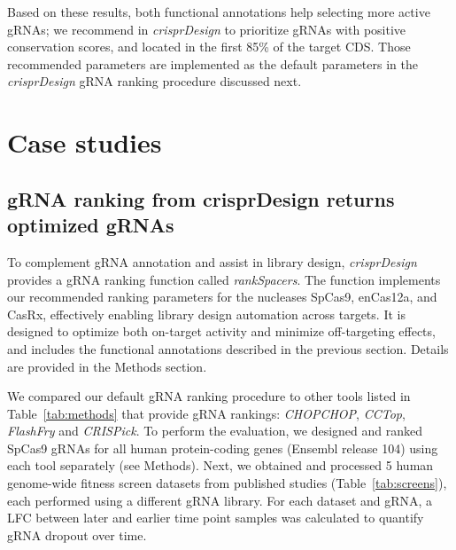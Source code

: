 \documentclass[pdftex,english,10pt]{article}
\begin{document}
Based on these results, both functional annotations help selecting more active gRNAs; we recommend in \textit{crisprDesign} to prioritize gRNAs with positive conservation scores, and located in the first 85\% of the target CDS. Those recommended parameters are implemented as the default parameters in the \textit{crisprDesign} gRNA ranking procedure discussed next. 






\section{Case studies}





\subsection{gRNA ranking from crisprDesign returns optimized gRNAs}

To complement gRNA annotation and assist in library design, \textit{crisprDesign} provides a gRNA ranking function called \textit{rankSpacers}. 
The function implements our recommended ranking parameters for the nucleases SpCas9, enCas12a, and CasRx, effectively enabling library design automation across targets. 
It is designed to optimize both on-target activity and minimize off-targeting effects, and includes the functional annotations described in the previous section. 
Details are provided in the Methods section. 


We compared our default gRNA ranking procedure to other tools listed in Table~\ref{tab:methods} that provide gRNA rankings: \textit{CHOPCHOP}, \textit{CCTop}, \textit{FlashFry} and \textit{CRISPick}. To perform the evaluation, we designed and ranked SpCas9 gRNAs for all human protein-coding genes (Ensembl release 104) using each tool separately (see Methods). Next, we obtained and processed 5 human genome-wide fitness screen datasets from published studies (Table~\ref{tab:screens}), each performed using a different gRNA library. For each dataset and gRNA, a LFC between later and earlier time point samples was calculated to quantify gRNA dropout over time. 
\end{document}

